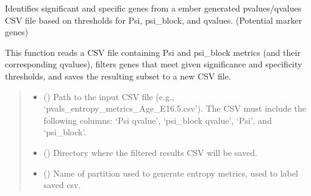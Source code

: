 \documentclass[letterpaper,10pt,english]{sphinxmanual}
\begin{document}
\begin{fulllineitems}
\label{\detokenize{ember_py:ember_py.top_genes.highly_specific_to_block}}
\pysigstartsignatures
\pysiglinewithargsret
{}
{\sphinxparamcomma {}\sphinxparamcomma {}\sphinxparamcomma {}\sphinxparamcomma {}\sphinxparamcomma {}\sphinxparamcomma {}}
{}
\pysigstopsignatures
\sphinxAtStartPar
Identifies significant and specific genes from a ember generated
p\sphinxhyphen{}values/q\sphinxhyphen{}values CSV file based on thresholds for Psi, psi\_block, and q\sphinxhyphen{}values.
(Potential marker genes)

\sphinxAtStartPar
This function reads a CSV file containing Psi and psi\_block metrics (and their
corresponding q\sphinxhyphen{}values), filters genes that meet given significance and
specificity thresholds, and saves the resulting subset to a new CSV file.
\begin{quote}\begin{description}
\begin{itemize}
\item {} 
\sphinxAtStartPar
{} (\sphinxstyleliteralemphasis{\sphinxupquote{, }}) \textendash{} Path to the input CSV file (e.g., ‘pvals\_entropy\_metrics\_Age\_E16.5.csv’).
The CSV must include the following columns:
‘Psi q\sphinxhyphen{}value’, ‘psi\_block q\sphinxhyphen{}value’, ‘Psi’, and ‘psi\_block’.

\item {} 
\sphinxAtStartPar
{} (\sphinxstyleliteralemphasis{\sphinxupquote{, }}) \textendash{} Directory where the filtered results CSV will be saved.

\item {} 
\sphinxAtStartPar
{} () \textendash{} Name of partition used to generate entropy metrics, used to label saved csv.


\end{itemize}
\end{description}
\end{quote}
\end{fulllineitems}
\end{document}
